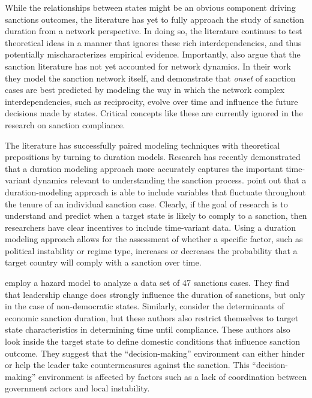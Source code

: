 While the relationships between states might be an obvious component driving sanctions outcomes, the literature has yet to fully approach the study of sanction duration from a network perspective. In doing so, the literature continues to test theoretical ideas in a manner that ignores these rich interdependencies, and thus potentially mischaracterizes empirical evidence. Importantly, \citet{cranmer2014reciprocity} also argue that the sanction literature has not yet accounted for network dynamics. In their work they model the sanction network itself, and demonstrate that \textit{onset} of sanction cases are best predicted by modeling the way in which the network complex interdependencies, such as reciprocity, evolve over time and influence the future decisions made by states. Critical concepts like these are currently ignored in the research on sanction compliance. 

The literature has successfully paired modeling techniques with theoretical prepositions by turning to duration models. Research has recently demonstrated that a duration modeling approach more accurately captures the important time-variant dynamics relevant to understanding the sanction process. \cite{bolks2000} point out that a duration-modeling approach is able to include variables that fluctuate throughout the tenure of an individual sanction case. Clearly, if the goal of research is to understand and predict when a target state is likely to comply to a sanction, then researchers have clear incentives to include time-variant data. Using a duration modeling approach allows for the assessment of whether a specific factor, such as political instability or regime type, increases or decreases the probability that a target country will comply with a sanction over time.

\cite{mcgillivray2004} employ a hazard model to analyze a data set of 47 sanctions cases. They find that leadership change does strongly influence the duration of sanctions, but only in the case of non-democratic states. Similarly, \cite{bolks2000} consider the determinants of economic sanction duration, but these authors also restrict themselves to target state characteristics in determining time until compliance. These authors also look inside the target state to define domestic conditions that influence sanction outcome. They suggest that the ``decision-making'' environment can either hinder or help the leader take countermeasures against the sanction. This ``decision-making'' environment is affected by factors such as a lack of coordination between government actors and local instability. 


